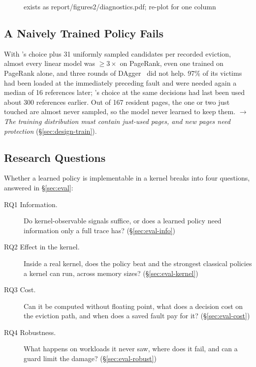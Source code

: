 \begin{figure}[t]
\centering
{}
{exists as report/figures2/diagnostics.pdf; re-plot for one column}
\caption{}
\label{fig:diagnostics}
\end{figure}

\subsection{A Naively Trained Policy Fails}
\label{sec:bg-naive}

With \belady's choice plus 31 uniformly sampled candidates per recorded eviction, almost
every linear model was $\geq3\times$ \clock on PageRank, even one trained on PageRank
alone, and three rounds of DAgger~\citep{ross2011dagger} did not help. 97\% of its
victims had been loaded at the immediately preceding fault and were needed again a
median of 16 references later; \belady's choice at the same decisions had last been used
about 300 references earlier. Out of 167 resident pages, the one or two just touched are
almost never sampled, so the model never learned to keep them.
$\rightarrow$ \emph{The training distribution must contain just-used pages, and new pages
need protection} (\S\ref{sec:design-train}).
 

\subsection{Research Questions}
\label{sec:bg-rq}

Whether a learned policy is implementable in a kernel breaks into four questions,
answered in \S\ref{sec:eval}:
\begin{description}
\item[RQ1 Information.] Do kernel-observable signals suffice, or does a learned policy
  need information only a full trace has? (\S\ref{sec:eval-info})
\item[RQ2 Effect in the kernel.] Inside a real kernel, does the policy beat \clock and
  the strongest classical policies a kernel can run, across memory sizes?
  (\S\ref{sec:eval-kernel})
\item[RQ3 Cost.] Can it be computed without floating point, what does a decision cost
  on the eviction path, and when does a saved fault pay for it? (\S\ref{sec:eval-cost})
\item[RQ4 Robustness.] What happens on workloads it never saw, where does it fail, and
  can a guard limit the damage? (\S\ref{sec:eval-robust})
\end{description}
